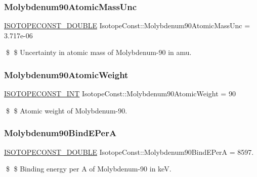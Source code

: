 \subsubsection{\texorpdfstring{Molybdenum90\+Atomic\+Mass\+Unc}{Molybdenum90AtomicMassUnc}}
{\footnotesize\ttfamily \mbox{\hyperlink{group___isotope_const-_macros_ga8f45a7272ce02c0b4c65c44636ed719a}{I\+S\+O\+T\+O\+P\+E\+C\+O\+N\+S\+T\+\_\+\+D\+O\+U\+B\+LE}} Isotope\+Const\+::\+Molybdenum90\+Atomic\+Mass\+Unc = 3.\+717e-\/06}

\$ \$ Uncertainty in atomic mass of Molybdenum-\/90 in amu. \mbox{\label{group___isotope_const-_molybdenum-_mo90_ga1abc3750eb85320cfef4283eb1a6ad0a}} 
\subsubsection{\texorpdfstring{Molybdenum90\+Atomic\+Weight}{Molybdenum90AtomicWeight}}
{\footnotesize\ttfamily \mbox{\hyperlink{group___isotope_const-_macros_ga5f18360b3e99483a35c32d789e62621c}{I\+S\+O\+T\+O\+P\+E\+C\+O\+N\+S\+T\+\_\+\+I\+NT}} Isotope\+Const\+::\+Molybdenum90\+Atomic\+Weight = 90}

\$ \$ Atomic weight of Molybdenum-\/90. \mbox{\label{group___isotope_const-_molybdenum-_mo90_ga742d3dd9f7f302436b5a13614a6190c4}} 
\subsubsection{\texorpdfstring{Molybdenum90\+Bind\+E\+PerA}{Molybdenum90BindEPerA}}
{\footnotesize\ttfamily \mbox{\hyperlink{group___isotope_const-_macros_ga8f45a7272ce02c0b4c65c44636ed719a}{I\+S\+O\+T\+O\+P\+E\+C\+O\+N\+S\+T\+\_\+\+D\+O\+U\+B\+LE}} Isotope\+Const\+::\+Molybdenum90\+Bind\+E\+PerA = 8597.}

\$ \$ Binding energy per A of Molybdenum-\/90 in keV. \mbox{\label{group___isotope_const-_molybdenum-_mo90_gae9d32ae1b16e30d6d036b582db8765cd}} 
